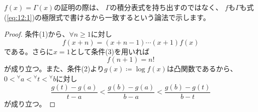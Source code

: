 \documentclass[report]{jlreq}
\begin{document}
$f(x) = \Gamma(x)$の証明の際は、
$\Gamma$の積分表式を持ち出すのではなく、
$f$も$\Gamma$も式(\ref{eq:12:1})の極限式で書けるから一致するという論法で示します。

\begin{proof}
    条件(1)から、$\forall n \ge 1$に対し
    \begin{equation}
        f(x + n) = (x + n - 1) \cdots (x + 1) f(x)
        \label{11:eq:5}
    \end{equation}
    である。さらに$x = 1$として条件(3)を用いれば
    \begin{equation}
        f(n + 1) = n!
        \label{11:eq:6}
    \end{equation}
    が成り立つ。また、条件(2)より$g(x) \coloneqq \log f(x)$は凸関数であるから、
    $0 < {}^\forall a < {}^\forall t < {}^\forall b$に対し
    \begin{equation}
        \frac{g(t) - g(a)}{t - a}
            < \frac{g(b) - g(a)}{b - a}
            < \frac{g(b) - g(t)}{b - t}
        \label{11:eq:3}
    \end{equation}
    が成り立つ。


\end{proof}
\end{document}
